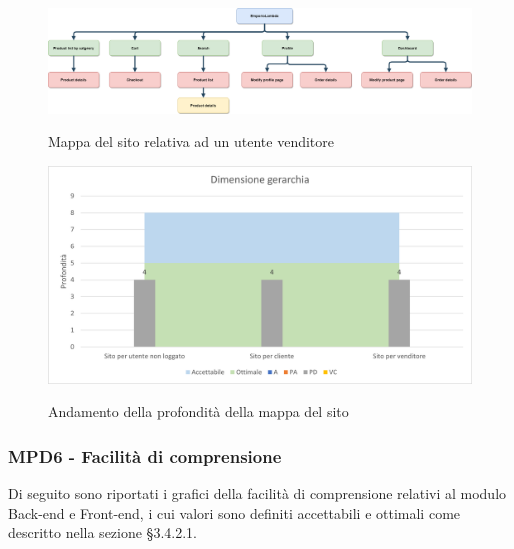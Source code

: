 \begin{figure}[H]
\centering
\includegraphics[scale=0.27]{res/ResocontoAttivitaDiVerifica/res/metriche/grafici/img/mappaSitoMerchant.png}\\
\caption{Mappa del sito relativa ad un utente venditore}
\end{figure}

\begin{figure}[H]
\centering
\includegraphics[scale=0.78]{res/ResocontoAttivitaDiVerifica/res/metriche/grafici/img/dimensioneGerarchia.png}\\
\caption{Andamento della profondità della mappa del sito}
\end{figure}

\subsubsection{MPD6 - Facilità di comprensione}
Di seguito sono riportati i grafici della facilità di comprensione relativi al modulo Back-end e Front-end, i cui valori sono definiti accettabili e ottimali come descritto nella sezione §3.4.2.1.\\

